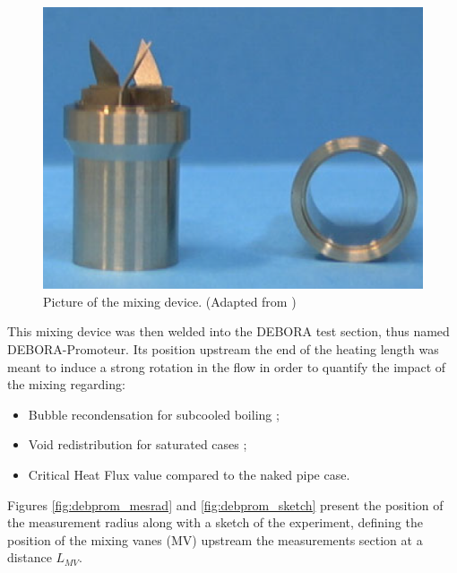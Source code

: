 \begin{figure}[!h]
\centering
\includegraphics[width=0.3\linewidth]{img/DEBORA-Promoteur/prom_pic2.png}
\caption{Picture of the mixing device. (Adapted from \cite{falk_agate})}
\label{fig:debprom_vanes}
\end{figure}

\npar

This mixing device was then welded into the DEBORA test section, thus named DEBORA-Promoteur. Its position upstream the end of the heating length was meant to induce a strong rotation in the flow in order to quantify the impact of the mixing regarding:

\begin{itemize}
\item Bubble recondensation for subcooled boiling ;
\item Void redistribution for saturated cases ;
\item Critical Heat Flux value compared to the naked pipe case.
\end{itemize}

Figures \ref{fig:debprom_mesrad} and \ref{fig:debprom_sketch} present the position of the measurement radius along with a sketch of the experiment, defining the position of the mixing vanes (MV) upstream the measurements section at a distance $L_{MV}$.




